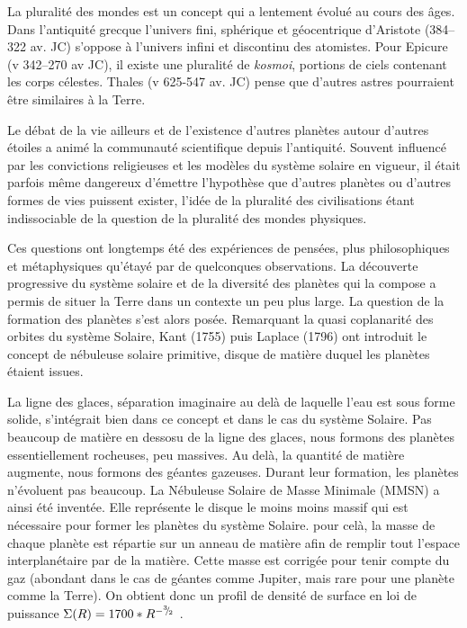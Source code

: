 


La pluralité des mondes est un concept qui a lentement évolué au cours des âges. Dans l'antiquité grecque l'univers fini, sphérique et géocentrique d'Aristote (384--322 av. JC) s'oppose à l'univers infini et discontinu des atomistes. Pour Epicure (v 342--270 av JC), il existe une pluralité de \textit{kosmoi}, portions de ciels contenant les corps célestes. Thales (v 625-547 av. JC) pense que d'autres astres pourraient être similaires à la Terre. 

Le débat de la vie ailleurs et de l'existence d'autres planètes autour d'autres étoiles a animé la communauté scientifique
depuis l'antiquité. Souvent influencé par les convictions religieuses et les modèles du système solaire en vigueur, il était
parfois même dangereux d'émettre l'hypothèse que d'autres planètes ou d'autres formes de vies puissent exister, l'idée de la
pluralité des civilisations étant indissociable de la question de la pluralité des mondes physiques. 

Ces questions ont longtemps été des expériences de pensées, plus philosophiques et métaphysiques qu'étayé par de quelconques observations. La découverte progressive du système solaire et de la diversité des planètes qui la compose a permis de situer la Terre dans un contexte un peu plus large. La question de la formation des planètes s'est alors posée. Remarquant la quasi coplanarité des orbites du système Solaire, Kant (1755) puis Laplace (1796) ont introduit le concept de nébuleuse solaire primitive, disque de matière duquel les planètes étaient issues. 

La ligne des glaces, séparation imaginaire au delà de laquelle l'eau est sous forme solide, s'intégrait bien dans ce concept et dans le cas du système Solaire. Pas beaucoup de matière en dessosu de la ligne des glaces, nous formons des planètes essentiellement rocheuses, peu massives. Au delà, la quantité de matière augmente, nous formons des géantes gazeuses. Durant leur formation, les planètes n'évoluent pas beaucoup. La Nébuleuse Solaire de Masse Minimale (MMSN) a ainsi été inventée. Elle représente le disque le moins moins massif qui est nécessaire pour former les planètes du système Solaire. pour celà, la masse de chaque planète est répartie sur un anneau de matière afin de remplir tout l'espace interplanétaire par de la matière. Cette masse est corrigée pour tenir compte du gaz (abondant dans le cas de géantes comme Jupiter, mais rare pour une planète comme la Terre). On obtient donc un profil de densité de surface en loi de puissance $\Sigma(R)=1700 * R^{-{{}^{3\!\!}/ _{\!2}}}$ \citep{
weidenschilling1977distribution, hayashi1981structure}.

